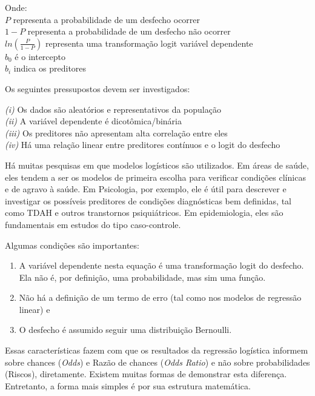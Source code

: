 \documentclass[
]{book}
\providecommand{\tightlist}{%
  \setlength{\itemsep}{0pt}\setlength{\parskip}{0pt}}
\begin{document}
Onde:\\
\(P\) representa a probabilidade de um desfecho ocorrer\\
\(1-P\) representa a probabilidade de um desfecho não ocorrer\\
\(ln\left ( \frac{P}{1-P} \right)\) representa uma transformação logit variável dependente\\
\(b_0\) é o intercepto\\
\(b_i\) indica os preditores

Os seguintes pressupostos devem ser investigados:

\emph{(i)} Os dados são aleatórios e representativos da população\\
\emph{(ii)} A variável dependente é dicotômica/binária\\
\emph{(iii)} Os preditores não apresentam alta correlação entre eles\\
\emph{(iv)} Há uma relação linear entre preditores contínuos e o logit do desfecho

Há muitas pesquisas em que modelos logísticos são utilizados. Em áreas de saúde, eles tendem a ser os modelos de primeira escolha para verificar condições clínicas e de agravo à saúde. Em Psicologia, por exemplo, ele é útil para descrever e investigar os possíveis preditores de condições diagnósticas bem definidas, tal como TDAH e outros transtornos psiquiátricos. Em epidemiologia, eles são fundamentais em estudos do tipo caso-controle.

Algumas condições são importantes:

\begin{enumerate}
\def\labelenumi{(\arabic{enumi})}
\tightlist
\item
  A variável dependente nesta equação é uma transformação logit do desfecho. Ela não é, por definição, uma probabilidade, mas sim uma função.\\
\item
  Não há a definição de um termo de erro (tal como nos modelos de regressão linear) e\\
\item
  O desfecho é assumido seguir uma distribuição Bernoulli.
\end{enumerate}

Essas características fazem com que os resultados da regressão logística informem sobre chances (\emph{Odds}) e Razão de chances (\emph{Odds Ratio}) e não sobre probabilidades (Riscos), diretamente. Existem muitas formas de demonstrar esta diferença. Entretanto, a forma mais simples é por sua estrutura matemática.
\end{document}

